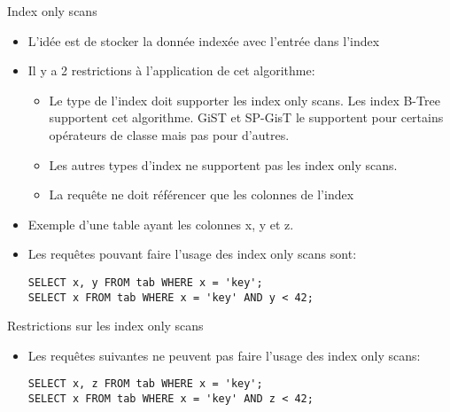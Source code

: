 \begin{frame}[fragile]{Index only scans}

   \begin{itemize}
      \item L'idée est de stocker la donnée indexée avec l'entrée dans l'index
      \item Il y a 2 restrictions à l'application de cet algorithme:
      \begin{itemize}
         \item Le type de l'index doit supporter les index only scans. Les index B-Tree supportent cet algorithme. GiST et SP-GisT le supportent pour certains opérateurs de classe mais pas pour d'autres.
         \item Les autres types d'index ne supportent pas les index only scans.
         \item La requête ne doit référencer que les colonnes de l'index
      \end{itemize}
      \item Exemple d'une table ayant les colonnes x, y et z.
      \item Les requêtes pouvant faire l'usage des index only scans sont:
\begin{tiny}
\begin{Verbatim}[commandchars=\\\{\}]
SELECT x, y FROM tab WHERE x = 'key';
SELECT x FROM tab WHERE x = 'key' AND y < 42;
\end{Verbatim}
\end{tiny}
   \end{itemize}

\end{frame}


\begin{frame}[fragile]{Restrictions sur les index only scans}

   \begin{itemize}
      \item Les requêtes suivantes ne peuvent pas faire l'usage des index only scans:
\begin{tiny}
\begin{Verbatim}[commandchars=\\\{\}]
SELECT x, z FROM tab WHERE x = 'key';
SELECT x FROM tab WHERE x = 'key' AND z < 42;
\end{Verbatim}
\end{tiny}
   \end{itemize}

\end{frame}

